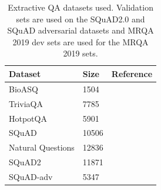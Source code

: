 \documentclass[11pt]{article}
\begin{document}
\begin{table}[]
\centering
\begin{tabular}{lll}
\hline
Dataset & Size & Reference \\ \hline
BioASQ & 1504 & \citet{fisch_mrqa_2019} \\
TriviaQA & 7785 &  \\
HotpotQA & 5901 &  \\
SQuAD & 10506 &  \\
Natural Questions & 12836 &  \\
SQuAD2 & 11871 & \citet{rajpurkar_know_2018} \\
SQuAD-adv & 5347 & \cite{jia_adversarial_2017} \\ \hline
\end{tabular}
\caption{Extractive QA datasets used. Validation sets are used on the SQuAD2.0 and SQuAD adversarial datasets and MRQA 2019 dev sets are used for the MRQA 2019 sets.}
\label{tab:extractive_qa_datasets}
\end{table}
\end{document}
